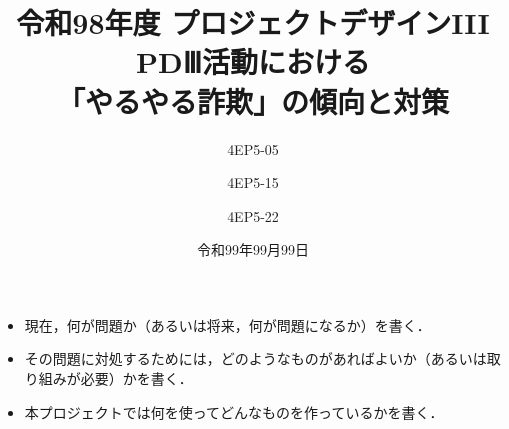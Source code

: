 





% 

\iffalse 
\MyLogo{\texttt{[image: fig/logo/kit\_landscape1.eps]}}
\lfoot{\texttt{[image: fig/logo/kit\_landscape1.eps]}}
\else
{} %
\fi

% 
%
\cfoot{\thepage/\pageref{MUSUBI}}





% 
%

\title{
{\normalsize 令和98年度 プロジェクトデザインIII}\\\vspace{10mm}
{\LARGE PDⅢ活動における\\「やるやる詐欺」の傾向と対策}
}
\date{令和99年99月99日}
\author{
4EP5-05\\  \and
4EP5-15\\  \and 
4EP5-22\\ 
}




\maketitle %

\begin{itemize}
 \item 現在，何が問題か（あるいは将来，何が問題になるか）を書く．
 \item その問題に対処するためには，どのようなものがあればよいか（あるいは取り組みが必要）かを書く．
 \item 本プロジェクトでは何を使ってどんなものを作っているかを書く．
\end{itemize}
\newpage

